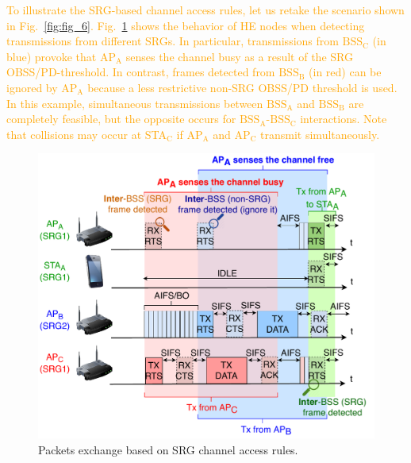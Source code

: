 \documentclass{ieeeaccess}
\begin{document}
\textcolor{orange}{To illustrate the SRG-based channel access rules, let us retake the scenario shown in Fig.~\ref{fig:fig_6}. Fig.~\ref{fig:srg_channel_access} shows the behavior of HE nodes when detecting transmissions from different SRGs. In particular, transmissions from $\text{BSS}_\text{C}$ (in blue) provoke that $\text{AP}_\text{A}$ senses the channel busy as a result of the SRG OBSS/PD-threshold. In contrast, frames detected from $\text{BSS}_\text{B}$ (in red) can be ignored by $\text{AP}_\text{A}$ because a less restrictive non-SRG OBSS/PD threshold is used. In this example, simultaneous transmissions between $\text{BSS}_\text{A}$ and $\text{BSS}_\text{B}$ are completely feasible, but the opposite occurs for $\text{BSS}_\text{A}$-$\text{BSS}_\text{C}$ interactions. Note that collisions may occur at STA$_\text{C}$ if $\text{AP}_\text{A}$ and $\text{AP}_\text{C}$ transmit simultaneously.}
\begin{figure}[ht!]
	\centering
	\includegraphics[width=\columnwidth]{fig_7}
	\caption{Packets exchange based on SRG channel access rules.}
	\label{fig:srg_channel_access}
\end{figure} 

\end{document}
